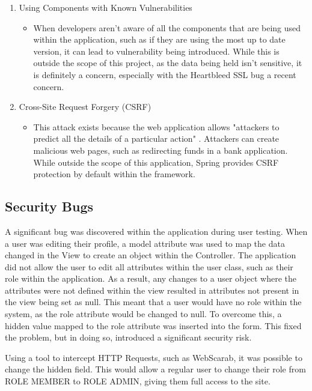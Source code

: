 \begin{enumerate}
\item Using Components with Known Vulnerabilities
\begin{itemize}
\item When developers aren't aware of all the components that are being used within the application, such as if they are using the most up to date version, it can lead to vulnerability being introduced. While this is outside the scope of this project, as the data being held isn't sensitive, it is definitely a concern, especially with the Heartbleed SSL bug a recent concern. 
\end{itemize}

\item Cross-Site Request Forgery (CSRF)
\begin{itemize}
\item This attack exists because the web application allows "attackers to predict all the details of a particular action" \parencite{owasp2013}. Attackers can create malicious web pages, such as redirecting funds in a bank application. While outside the scope of this application, Spring provides CSRF protection by default within the framework.
\end{itemize}
\end{enumerate}


\subsection{Security Bugs}

A significant bug was discovered within the application during user testing. When a user was editing their profile, a model attribute was used to map the data changed in the View to create an object within the Controller. The application did not allow the user to edit all attributes within the user class, such as their role within the application. As a result, any changes to a user object where the attributes were not defined within the view resulted in attributes not present in the view being set as null. This meant that a user would have no role within the system, as the role attribute would be changed to null. To overcome this, a hidden value mapped to the role attribute was inserted into the form. This fixed the problem, but in doing so, introduced a significant security risk. 

Using a tool to intercept HTTP Requests, such as WebScarab, it was possible to change the hidden field. This would allow a regular user to change their role from ROLE MEMBER to ROLE ADMIN, giving them full access to the site. 

